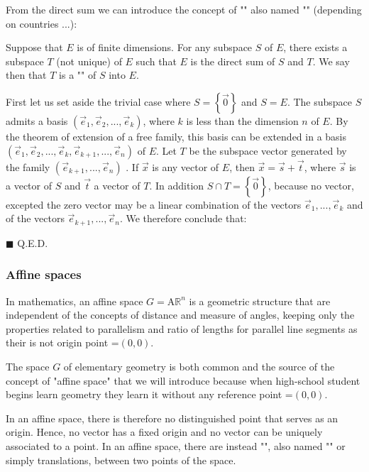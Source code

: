 	From the direct sum we can introduce the concept of "" also named "" (depending on countries ...):
	\begin{theorem}
	Suppose that $E$ is of finite dimensions. For any subspace $S$ of $E$, there exists a subspace $T$ (not unique) of $E$ such that $E$ is the direct sum of $S$ and $T$. We say then that $T$ is a "" of $S$ into $E$.
	\end{theorem}
	\begin{dem}
	First let us set aside the trivial case where $S=\left\lbrace \vec{0} \right\rbrace$  and $S = E$. The subspace $S$ admits a basis $(\vec{e}_1,\vec{e}_2,...,\vec{e}_k)$, where $k$ is less than the dimension $n$ of $E$. By the theorem of extension of a free family, this basis can be extended in a basis $(\vec{e}_1,\vec{e}_2,...,\vec{e}_k,\vec{e}_{k+1},...,\vec{e}_n)$ of $E$. Let $T$ be the subspace vector generated by the family $(\vec{e}_{k+1},...,\vec{e}_n)$ . If $\vec{x}$ is any vector of $E$, then $\vec{x}=\vec{s}+\vec{t}$, where $\vec{s}$ is a vector of $S$ and $\vec{t}$ a vector of $T$. In addition $S\cap T=\left\lbrace \vec{0} \right\rbrace$, because no vector, excepted the zero vector may be a linear combination of the vectors $\vec{e}_1,...,\vec{e}_k$ and of the vectors $\vec{e}_{k+1},...,\vec{e}_n$. We therefore conclude that:
	 
	\begin{flushright}
		$\blacksquare$  Q.E.D.
	\end{flushright}
	\end{dem}
	
	\subsubsection{Affine spaces}\label{affine space}
	In mathematics, an affine space $G=\text{A}\mathbb{R}^n$ is a geometric structure that are independent of the concepts of distance and measure of angles, keeping only the properties related to parallelism and ratio of lengths for parallel line segments as their is not origin point $\text{=}(0,0)$.
	
	The space $G$ of elementary geometry is both common and the source of the concept of "affine space" that we will introduce because when high-school student begins learn geometry they learn it without any reference point $\text{=}(0,0)$.

	In an affine space, there is therefore no distinguished point that serves as an origin. Hence, no vector has a fixed origin and no vector can be uniquely associated to a point. In an affine space, there are instead "", also named "\label{translation vector}" or simply translations, between two points of the space.
	
